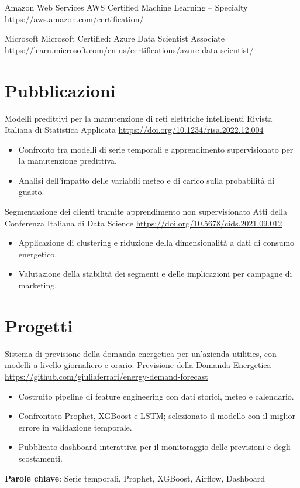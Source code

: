 \documentclass[a4paper, serif, 10pt]{moderncv}
\begin{document}
        {Amazon Web Services}
        {AWS Certified Machine Learning – Specialty}
        {\url{https://aws.amazon.com/certification/}}
        {}
        {}

        {Microsoft}
        {Microsoft Certified: Azure Data Scientist Associate}
        {\url{https://learn.microsoft.com/en-us/certifications/azure-data-scientist/}}
        {}
        {}
\section{Pubblicazioni}

        {Modelli predittivi per la manutenzione di reti elettriche intelligenti}
        {Rivista Italiana di Statistica Applicata}
        {\url{https://doi.org/10.1234/risa.2022.12.004}}
        {}
        {\begin{itemize}
\item Confronto tra modelli di serie temporali e apprendimento supervisionato per la manutenzione predittiva.
\item Analisi dell'impatto delle variabili meteo e di carico sulla probabilità di guasto.
\end{itemize}}

        {Segmentazione dei clienti tramite apprendimento non supervisionato}
        {Atti della Conferenza Italiana di Data Science}
        {\url{https://doi.org/10.5678/cids.2021.09.012}}
        {}
        {\begin{itemize}
\item Applicazione di clustering e riduzione della dimensionalità a dati di consumo energetico.
\item Valutazione della stabilità dei segmenti e delle implicazioni per campagne di marketing.
\end{itemize}}
\section{Progetti}

        {Sistema di previsione della domanda energetica per un'azienda utilities, con modelli a livello giornaliero e orario.}
        {Previsione della Domanda Energetica}
        {\url{https://github.com/giuliaferrari/energy-demand-forecast}}
        {}
        {\begin{itemize}
\item Costruito pipeline di feature engineering con dati storici, meteo e calendario.
\item Confrontato Prophet, XGBoost e LSTM; selezionato il modello con il miglior errore in validazione temporale.
\item Pubblicato dashboard interattiva per il monitoraggio delle previsioni e degli scostamenti.
\end{itemize}
\textbf{Parole chiave}: Serie temporali, Prophet, XGBoost, Airflow, Dashboard}
\end{document}
